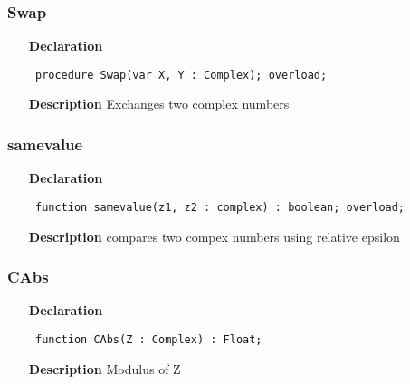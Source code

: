 \documentclass[12pt,a4paper,oneside]{report}
\newcommand{\declarationitem}[1]{\textbf{#1}}
\newcommand{\descriptiontitle}[1]{\textbf{#1}}
\newcommand{\code}[1]{\texttt{#1}}
\begin{document}
\subsubsection{Swap}
\label{ucomplex-Swap}
\begin{itemize}\item[\declarationitem{Declaration}\hfill]
\begin{flushleft}
\code{
procedure Swap(var X, Y : Complex); overload;}

\end{flushleft}

\par
\item[\descriptiontitle{Description}]
Exchanges two complex numbers

\end{itemize}
\subsubsection{samevalue}
\label{ucomplex-samevalue}
\begin{itemize}\item[\declarationitem{Declaration}\hfill]
\begin{flushleft}
\code{
function samevalue(z1, z2 : complex) : boolean; overload;}

\end{flushleft}

\par
\item[\descriptiontitle{Description}]
compares two compex numbers using relative epsilon

\end{itemize}
\subsubsection{CAbs}
\label{ucomplex-CAbs}
\begin{itemize}\item[\declarationitem{Declaration}\hfill]
\begin{flushleft}
\code{
function CAbs(Z : Complex) : Float;}

\end{flushleft}

\par
\item[\descriptiontitle{Description}]
Modulus of Z

\end{itemize}
\end{document}

